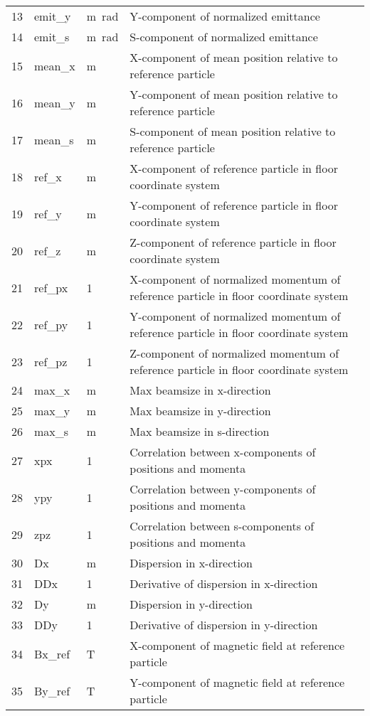 \begin{center}
\begin{longtable}{p{1.2cm}p{1.9cm}p{1.3cm}p{9.5cm}}
13 & emit\_y & \si{\meter\radian} & Y-component of normalized emittance\\
14 & emit\_s & \si{\meter\radian} & S-component of normalized emittance\\
15 & mean\_x & \si{\meter} & X-component of mean position relative to reference particle\\
16 & mean\_y & \si{\meter} & Y-component of mean position relative to reference particle\\
17 & mean\_s & \si{\meter} & S-component of mean position relative to reference particle\\
18 & ref\_x & \si{\meter} & X-component of reference particle in floor coordinate system\\
19 & ref\_y & \si{\meter} & Y-component of reference particle in floor coordinate system\\
20 & ref\_z & \si{\meter} & Z-component of reference particle in floor coordinate system\\
21 & ref\_px & 1 & X-component of normalized momentum of reference particle in floor coordinate system\\
22 & ref\_py & 1 & Y-component of normalized momentum of reference particle in floor coordinate system\\
23 & ref\_pz & 1 & Z-component of normalized momentum of reference particle in floor coordinate system\\
24 & max\_x & \si{\meter} & Max beamsize in x-direction\\
25 & max\_y & \si{\meter} & Max beamsize in y-direction\\
26 & max\_s & \si{\meter} & Max beamsize in s-direction\\
27 & xpx & 1 & Correlation between x-components of positions and momenta\\
28 & ypy & 1 & Correlation between y-components of positions and momenta\\
29 & zpz & 1 & Correlation between s-components of positions and momenta\\
30 & Dx & \si{\meter} & Dispersion in x-direction\\
31 & DDx & 1 & Derivative of dispersion in x-direction\\
32 & Dy & \si{\meter} & Dispersion in y-direction\\
33 & DDy & 1 & Derivative of dispersion in y-direction\\
34 & Bx\_ref & \si{\tesla} & X-component of magnetic field at reference particle\\
35 & By\_ref & \si{\tesla} & Y-component of magnetic field at reference particle\\

\end{longtable}
\end{center}
